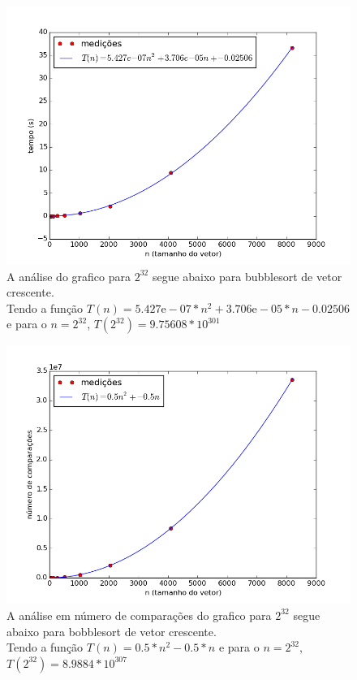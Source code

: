 \documentclass[12pt,a4paper,twoside]{report}
\begin{document}


\begin{figure}[ht]
\centering \includegraphics[scale=0.8]{../bolha/imagens/bolhaCrescente0.png}
\caption{A análise do grafico para $2^{32}$ segue abaixo para bubblesort de vetor crescente.\\
Tendo a função $T(n) = 5.427\mathrm{e}-07*n^2+3.706\mathrm{e}-05*n-0.02506$ e para o $n =2^{32}$, $T(2^{32}) = 9.75608 * 10^{301}$}
\label{fig:bolhaCrescente0}
\end{figure}

\begin{figure}[ht]
\centering \includegraphics[scale=0.8]{../bolha/imagens/bolhaCrescente1.png}
\caption{A análise em número de comparações do grafico para $2^{32}$ segue abaixo para bobblesort de vetor crescente.\\
Tendo a função $T(n) = 0.5*n^2 - 0.5*n$ e para o $n =2^{32}$, $T(2^{32}) = 8.9884 * 10^{307}$}
\label{fig:bolhaCrescente1}
\end{figure}
\end{document}
